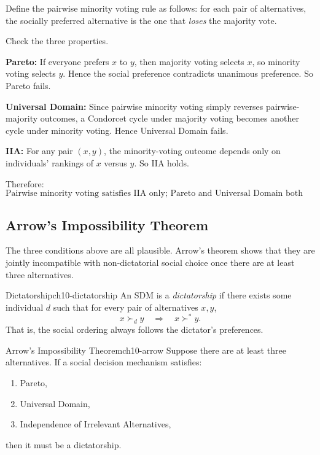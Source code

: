 \begin{examplebox}[title={Worked Example: Pairwise minority voting}]
Define the pairwise minority voting rule as follows: for each pair of alternatives, the socially preferred alternative is the one that \emph{loses} the majority vote.

Check the three properties.

\textbf{Pareto:} If everyone prefers $x$ to $y$, then majority voting selects $x$, so minority voting selects $y$. Hence the social preference contradicts unanimous preference. So Pareto fails.

\textbf{Universal Domain:} Since pairwise minority voting simply reverses pairwise-majority outcomes, a Condorcet cycle under majority voting becomes another cycle under minority voting. Hence Universal Domain fails.

\textbf{IIA:} For any pair $(x,y)$, the minority-voting outcome depends only on individuals' rankings of $x$ versus $y$. So IIA holds.

Therefore:
\[
\boxed{\text{Pairwise minority voting satisfies IIA only; Pareto and Universal Domain both fail.}}
\]
\end{examplebox}

\subsection{Arrow's Impossibility Theorem}

The three conditions above are all plausible. Arrow's theorem shows that they are jointly incompatible with non-dictatorial social choice once there are at least three alternatives.

\begin{definition}{Dictatorship}{ch10-dictatorship}
An SDM is a \emph{dictatorship} if there exists some individual $d$ such that for every pair of alternatives $x,y$,
\[
x \succ_d y
\quad \Longrightarrow \quad
x \succ^* y.
\]
That is, the social ordering always follows the dictator's preferences.
\end{definition}

\begin{theorem}{Arrow's Impossibility Theorem}{ch10-arrow}
Suppose there are at least three alternatives. If a social decision mechanism satisfies:
\begin{enumerate}
    \item Pareto,
    \item Universal Domain,
    \item Independence of Irrelevant Alternatives,
\end{enumerate}
then it must be a dictatorship.
\end{theorem}

